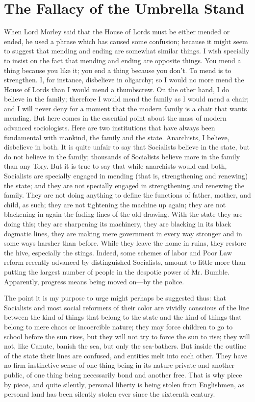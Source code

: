 \documentclass{book}
\begin{document}
\chapter{The Fallacy of the Umbrella Stand}
\label{chapter-48}
When Lord Morley said that the House of Lords must be either mended or ended, he used a phrase which has caused some confusion; because it might seem to suggest that mending and ending are somewhat similar things. I wish specially to insist on the fact that mending and ending are opposite things. You mend a thing because you like it; you end a thing because you don’t. To mend is to strengthen. I, for instance, disbelieve in oligarchy; so I would no more mend the House of Lords than I would mend a thumbscrew. On the other hand, I do believe in the family; therefore I would mend the family as I would mend a chair; and I will never deny for a moment that the modern family is a chair that wants mending. But here comes in the essential point about the mass of modern advanced sociologists. Here are two institutions that have always been fundamental with mankind, the family and the state. Anarchists, I believe, disbelieve in both. It is quite unfair to say that Socialists believe in the state, but do not believe in the family; thousands of Socialists believe more in the family than any Tory. But it is true to say that while anarchists would end both, Socialists are specially engaged in mending (that is, strengthening and renewing) the state; and they are not specially engaged in strengthening and renewing the family. They are not doing anything to define the functions of father, mother, and child, as such; they are not tightening the machine up again; they are not blackening in again the fading lines of the old drawing. With the state they are doing this; they are sharpening its machinery, they are blacking in its black dogmatic lines, they are making mere government in every way stronger and in some ways harsher than before. While they leave the home in ruins, they restore the hive, especially the stings. Indeed, some schemes of labor and Poor Law reform recently advanced by distinguished Socialists, amount to little more than putting the largest number of people in the despotic power of Mr. Bumble. Apparently, progress means being moved on—by the police.

The point it is my purpose to urge might perhaps be suggested thus: that Socialists and most social reformers of their color are vividly conscious of the line between the kind of things that belong to the state and the kind of things that belong to mere chaos or incoercible nature; they may force children to go to school before the sun rises, but they will not try to force the sun to rise; they will not, like Canute, banish the sea, but only the sea-bathers. But inside the outline of the state their lines are confused, and entities melt into each other. They have no firm instinctive sense of one thing being in its nature private and another public, of one thing being necessarily bond and another free. That is why piece by piece, and quite silently, personal liberty is being stolen from Englishmen, as personal land has been silently stolen ever since the sixteenth century.
\end{document}

